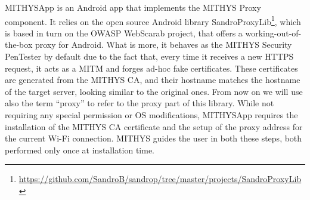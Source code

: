 \documentclass[english]{llncs}
\begin{document}
MITHYSApp is an Android app that implements the MITHYS Proxy component. It relies on the open source Android library SandroProxyLib\footnote{\url{https://github.com/SandroB/sandrop/tree/master/projects/SandroProxyLib}}, which is based in turn on the OWASP WebScarab project, that offers a working-out-of-the-box proxy for Android. What is more, it behaves as the MITHYS Security PenTester by default due to the fact that, every time it receives a new HTTPS request, it acts as a MITM and forges ad-hoc fake certificates. These certificates are generated from the MITHYS CA, and their hostname matches the hostname of the target server, looking similar to the original ones. From now on we will use also the term ``proxy'' to refer to the proxy part of this library. While not requiring any special permission or OS modifications, MITHYSApp requires the installation of the MITHYS CA certificate and the setup of the proxy address for the current Wi-Fi connection. MITHYS guides the user in both these steps, both performed only once at installation time.
\end{document}
